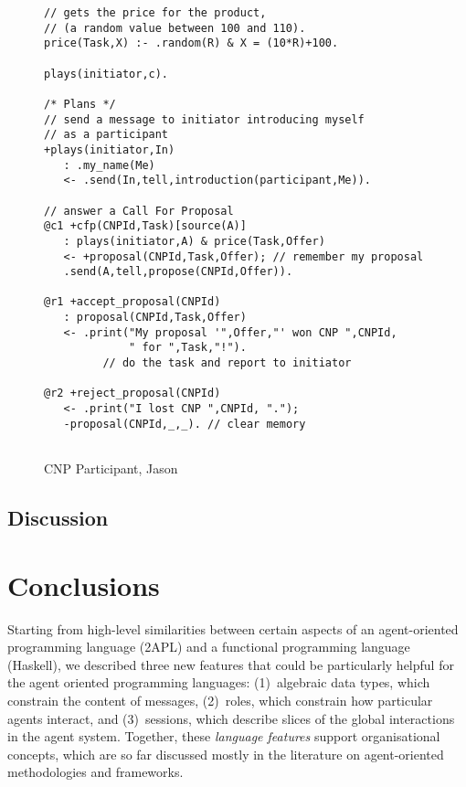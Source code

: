 \documentclass[a4paper,12pt,oneside,fleqn]{book} %
\begin{document}
\begin{figure}\footnotesize %
\begin{verbatim}
// gets the price for the product,
// (a random value between 100 and 110).
price(Task,X) :- .random(R) & X = (10*R)+100.

plays(initiator,c).

/* Plans */
// send a message to initiator introducing myself
// as a participant
+plays(initiator,In)
   : .my_name(Me)
   <- .send(In,tell,introduction(participant,Me)).

// answer a Call For Proposal
@c1 +cfp(CNPId,Task)[source(A)]
   : plays(initiator,A) & price(Task,Offer)
   <- +proposal(CNPId,Task,Offer); // remember my proposal
   .send(A,tell,propose(CNPId,Offer)).

@r1 +accept_proposal(CNPId)
   : proposal(CNPId,Task,Offer)
   <- .print("My proposal '",Offer,"' won CNP ",CNPId,
             " for ",Task,"!").
         // do the task and report to initiator

@r2 +reject_proposal(CNPId)
   <- .print("I lost CNP ",CNPId, ".");
   -proposal(CNPId,_,_). // clear memory


\end{verbatim}
\caption{CNP Participant, Jason}
\label{fig:jasonIn}
\end{figure} %
\section{Discussion} %


\chapter{Conclusions}\label{ch:conc} %

Starting from high-level similarities between certain aspects of an
agent-oriented programming language (2APL) and a functional programming
language (Haskell), we described three new features that could be
particularly helpful for the agent oriented programming languages:
(1)~algebraic data types, which constrain the content of messages,
(2)~roles, which constrain how particular agents interact, and
(3)~sessions, which describe slices of the global interactions in the agent
system. Together, these \emph{language features} support organisational
concepts, which are so far discussed mostly in the literature on
agent-oriented methodologies and frameworks.
\end{document}
